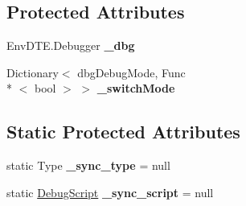 \subsection*{Protected Attributes}
\begin{DoxyCompactItemize}
\item 
\hypertarget{classlib_wather_debugger_1_1_script_1_1_debug_script_a0a5e677a1132d814869b036a51d541dc}{Env\+D\+T\+E.\+Debugger {\bfseries \+\_\+dbg}}\label{classlib_wather_debugger_1_1_script_1_1_debug_script_a0a5e677a1132d814869b036a51d541dc}

\item 
\hypertarget{classlib_wather_debugger_1_1_script_1_1_debug_script_ad4c004237f42c9075d6d3323aafb4749}{Dictionary$<$ dbg\+Debug\+Mode, Func\\*
$<$ bool $>$ $>$ {\bfseries \+\_\+switch\+Mode}}\label{classlib_wather_debugger_1_1_script_1_1_debug_script_ad4c004237f42c9075d6d3323aafb4749}

\end{DoxyCompactItemize}
\subsection*{Static Protected Attributes}
\begin{DoxyCompactItemize}
\item 
\hypertarget{classlib_wather_debugger_1_1_script_1_1_debug_script_aecbc75b282652ba8d9f3dcb9f1334549}{static Type {\bfseries \+\_\+sync\+\_\+type} = null}\label{classlib_wather_debugger_1_1_script_1_1_debug_script_aecbc75b282652ba8d9f3dcb9f1334549}

\item 
\hypertarget{classlib_wather_debugger_1_1_script_1_1_debug_script_a032e876f044ff72e77507629ed84fc7a}{static \hyperlink{classlib_wather_debugger_1_1_script_1_1_debug_script}{Debug\+Script} {\bfseries \+\_\+sync\+\_\+script} = null}\label{classlib_wather_debugger_1_1_script_1_1_debug_script_a032e876f044ff72e77507629ed84fc7a}

\end{DoxyCompactItemize}
